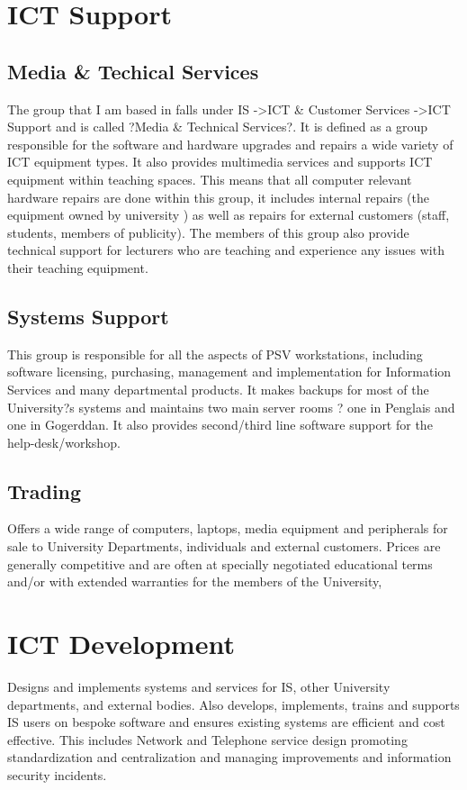 \documentclass[10pt,a4paper,headinclude=true]{report}
\begin{document}
\section{ICT Support}
\subsection{Media \& Techical Services}
The group that I am based in falls under IS -\textgreater ICT \& Customer Services -\textgreater ICT Support and is called ?Media \& Technical Services?. It is defined as a group responsible for the software and hardware upgrades and repairs a wide variety of ICT equipment types. It also provides multimedia services and supports ICT equipment within teaching spaces. This means that all computer relevant hardware repairs are done within this group, it includes internal repairs (the equipment owned by university ) as well as repairs for external customers (staff, students, members of publicity). The members of this group also provide technical support for lecturers who are teaching and experience any issues with their teaching equipment.
\subsection{Systems Support}
This group is responsible for all the aspects of PSV workstations, including software licensing, purchasing, management and implementation for Information Services and many departmental products. It makes backups for most of the University?s systems and maintains two main server rooms ? one in Penglais and one in Gogerddan. It also provides second/third line software support for the help-desk/workshop.
\subsection{Trading}
Offers a wide range of computers, laptops, media equipment and peripherals for sale to University Departments, individuals and external customers. Prices are generally competitive and are often at specially negotiated educational terms and/or with extended warranties for the members of the University,
\section{ICT Development}
Designs and implements systems and services for IS, other University departments, and external bodies. Also develops, implements, trains and supports IS users on bespoke software and ensures existing systems are efficient and cost effective. This includes Network and Telephone service design promoting standardization and centralization and managing improvements and information security incidents.
\end{document}
